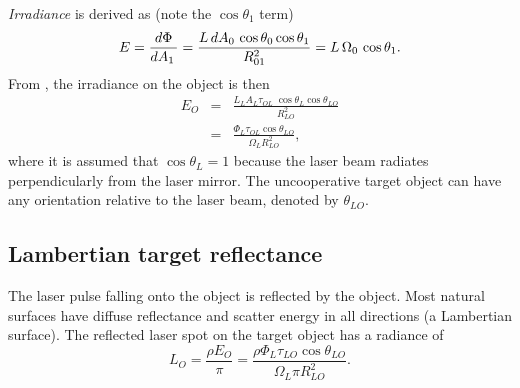 \textit{Irradiance} is derived as (note the $\cos\theta_1$ term)
\begin{equation}
E=\frac{d{}\Phi}{d{}A_1\,}=
\frac{L\,d{}A_0\,\cos\theta_0\cos\theta_1}{R_{01}^2}=L\,\Omega_0\,\cos\theta_1.
\label{irradef}
\end{equation}
From , the irradiance on the object is then 
\begin{eqnarray}
E_O&=&\frac{L_L A_L \tau_{OL}\;\cos\theta_L\cos\theta_{LO}}{R^2_{LO}}\nonumber\\
&=&\frac{\Phi_L \tau_{OL}\cos\theta_{LO}}{\Omega_L R^2_{LO}},
\end{eqnarray}
where it is assumed that $\cos\theta_{L}=1$ because the laser beam radiates perpendicularly from the laser mirror. The uncooperative target object can have any orientation relative to the laser beam, denoted by $\theta_{LO}$.


\subsection{Lambertian target reflectance}
\noindent
The laser pulse falling onto the object is reflected by the object. Most
natural surfaces have diffuse reflectance and scatter energy in all
directions (a Lambertian surface). The reflected laser spot on the target object has a radiance of
\begin{equation}
L_O=\frac{\rho E_O}{\pi}=\frac{\rho\Phi_L \tau_{LO}\cos\theta_{LO}}{\Omega_L
\pi R^2_{LO}}.\label{loo}
\end{equation}



